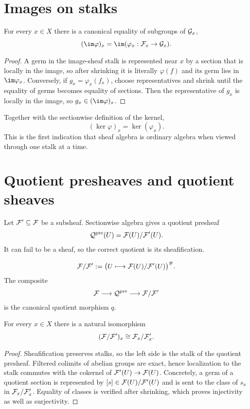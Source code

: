 \section{Images on stalks}

\begin{theorem}
For every $x\in X$ there is a canonical equality of subgroups of $\mathcal G_x$,
\[
(\im\varphi)_x=\im(\varphi_x:\F_x\to\G_x).
\]
\end{theorem}
\begin{proof}
A germ in the image-sheaf stalk is represented near $x$ by a section that is locally in the
image, so after shrinking it is literally $\varphi(f)$ and its germ lies in $\im\varphi_x$.
Conversely, if $g_x=\varphi_x(f_x)$, choose representatives and shrink until the equality of
germs becomes equality of sections.  Then the representative of $g_x$ is locally in the
image, so $g_x\in(\im\varphi)_x$.
\end{proof}

Together with the sectionwise definition of the kernel,
\[
(\ker\varphi)_x=\ker(\varphi_x).
\]
This is the first indication that sheaf algebra is ordinary algebra when viewed through one
stalk at a time.



\section{Quotient presheaves and quotient sheaves}

Let $\mathcal F'\subseteq\mathcal F$ be a subsheaf.  Sectionwise algebra gives a quotient presheaf
\[
\mathcal Q^{\mathrm{pre}}(U)=\mathcal F(U)/\mathcal F'(U).
\]
It can fail to be a sheaf, so the correct quotient is its sheafification.

\begin{definition}
\[
\mathcal F/\mathcal F':=\bigl(U\longmapsto\mathcal F(U)/\mathcal F'(U)\bigr)^\#.
\]
The composite
\[
\mathcal F\longrightarrow\mathcal Q^{\mathrm{pre}}\longrightarrow\mathcal F/\mathcal F'
\]
is the canonical quotient morphism $q$.
\end{definition}

\begin{theorem}
For every $x\in X$ there is a natural isomorphism
\[
(\mathcal F/\mathcal F')_x\cong\mathcal F_x/\mathcal F'_x.
\]
\end{theorem}
\begin{proof}
Sheafification preserves stalks, so the left side is the stalk of the quotient presheaf.
Filtered colimits of abelian groups are exact, hence localization to the stalk commutes with
the cokernel of $\mathcal F'(U)\to\mathcal F(U)$.  Concretely, a germ of a quotient section is represented
by $[s]\in\mathcal F(U)/\mathcal F'(U)$ and is sent to the class of $s_x$ in $\mathcal F_x/\mathcal F'_x$.  Equality of
classes is verified after shrinking, which proves injectivity as well as surjectivity.
\end{proof}


